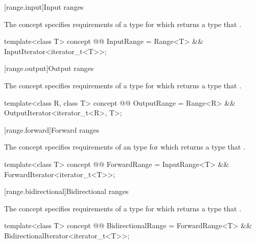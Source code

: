 {[range.input]{Input ranges}

\pnum
The  concept specifies requirements of
a  type for which  returns a type
that   .

%
\begin{itemdecl}
template<class T>
concept @@ InputRange =
  Range<T> && InputIterator<iterator_t<T>>;
\end{itemdecl}

[range.output]{Output ranges}

\pnum
The  concept specifies requirements of
a  type for which  returns a type that  
.

%
\begin{itemdecl}
template<class R, class T>
concept @@ OutputRange =
  Range<R> && OutputIterator<iterator_t<R>, T>;
\end{itemdecl}

[range.forward]{Forward ranges}

\pnum
The  concept specifies requirements of an
 type for which  returns a type that  
.

%
\begin{itemdecl}
template<class T>
concept @@ ForwardRange =
  InputRange<T> && ForwardIterator<iterator_t<T>>;
\end{itemdecl}

[range.bidirectional]{Bidirectional ranges}

\pnum
The  concept specifies requirements of a
 type for which  returns a type that  
.

%
\begin{itemdecl}
template<class T>
concept @@ BidirectionalRange =
  ForwardRange<T> && BidirectionalIterator<iterator_t<T>>;
\end{itemdecl}

}
